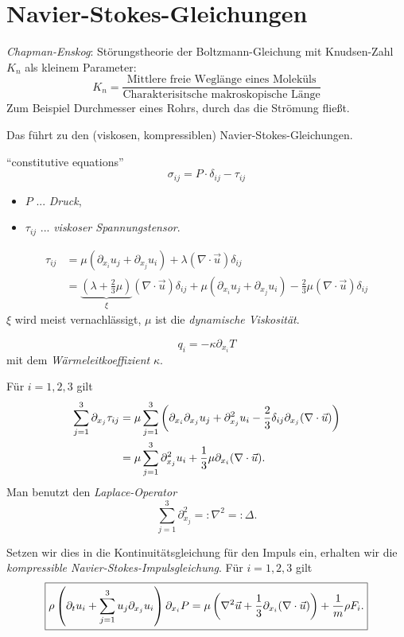 \section{Navier-Stokes-Gleichungen}
\emph{Chapman-Enskog}: Störungstheorie der Boltzmann-Gleichung mit Knudsen-Zahl
$K_n$ als kleinem Parameter:
\[ K_n = \frac{\text{Mittlere freie Weglänge eines Moleküls}}
  {\text{Charakterisitsche makroskopische Länge}} \]
Zum Beispiel Durchmesser eines Rohrs, durch das die Strömung fließt.

Das führt zu den (viskosen, kompressiblen) Navier-Stokes-Gleichungen.

``constitutive equations''
\[ \sigma_{ij} = P \cdot \delta_{ij} - \tau_{ij} \]
\begin{itemize}
\item $P$ ... \emph{Druck},
\item $\tau_{ij}$ ... \emph{viskoser Spannungstensor}.
\end{itemize}
\begin{align*}
  \tau_{ij}
  &= \mu (\partial_{x_i} u_j + \partial_{x_j} u_i )
    + \lambda (\nabla \cdot \vec{u}) \delta_{ij} \\
  &= \underbrace{\left( \lambda + \frac{2}{3}\mu  \right)}_{\xi}
    (\nabla \cdot \vec{u}) \delta_{ij}
    + \mu ( \partial_{x_i} u_j + \partial_{x_j} u_i )
    - \frac{2}{3} \mu (\nabla \cdot \vec{u}) \delta_{ij}
\end{align*}
$\xi$ wird meist vernachlässigt, $\mu$ ist die \emph{dynamische Viskosität}.

\[ q_i = -\kappa \partial_{x_i} T \]
mit dem \emph{Wärmeleitkoeffizient} $\kappa$.

Für $i = 1,2,3$ gilt
\begin{align*}
  \sum_{j=1}^3 \partial_{x_j} \tau_{ij}
  &= \mu \sum_{j=1}^3 \left( \partial_{x_i} \partial_{x_j} u_j +
    \partial_{x_j}^2 u_i - \frac{2}{3} \delta_{ij} \partial_{x_j}
    (\nabla \cdot \vec{u}) \right) \\
  &= \mu \sum_{j=1}^3 \partial_{x_j}^2 u_i
    + \frac{1}{3} \mu \partial_{x_i} (\nabla \cdot \vec{u}).
\end{align*}
Man benutzt den \emph{Laplace-Operator}
\[ \sum_{j=1}^3 \partial_{x_j}^2 =: \nabla^2 =: \Delta. \]

Setzen wir dies in die Kontinuitätsgleichung für den Impuls ein, erhalten wir
die \emph{kompressible Navier-Stokes-Impulsgleichung}. Für $i=1,2,3$ gilt
\[ \boxed{
    \rho \left(
      \partial_t u_i + \sum_{j=1}^3 u_j \partial_{x_j} u_i
    \right)
    \partial_{x_i} P
    = \mu \left(
      \nabla^2 \vec{u} + \frac{1}{3} \partial_{x_i} (\nabla \cdot \vec{u})
    \right)
    + \frac{1}{m} \rho F_i.
  } \]

